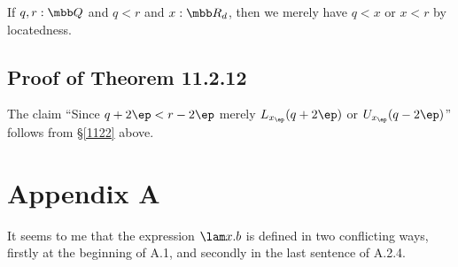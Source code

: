 \documentclass[12pt]{article}
\begin{document}
If $q,r:\mbb Q$ and $q<r$ and $x:\mbb R_d$, then we merely have $q<x$ or $x<r$ by locatedness.

\subsection{Proof of Theorem 11.2.12}

The claim ``Since $q+2\ep<r-2\ep$ merely $L_{x_\ep}(q+2\ep)$ or $U_{x_\ep}(q-2\ep)$'' follows from \S\ref{1122} above.


\section{Appendix A}

It seems to me that the expression $\lam x.b$ is defined in two conflicting ways, firstly at the beginning of A.1, and secondly in the last sentence of A.2.4. 
\end{document}
